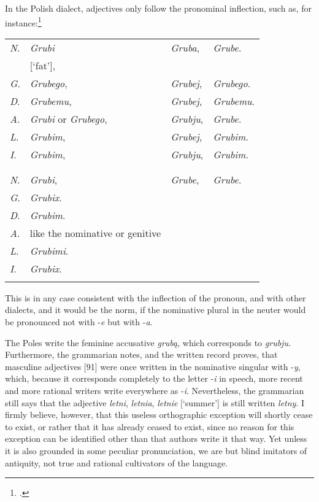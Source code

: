 In the Polish dialect, adjectives only follow the pronominal inflection, such as, for instance:\footnote{\citet[24]{adamowicz_praktische_1796-1}.}

\begin{longtable}{ l l l l }    
    \lsptoprule
    \multicolumn{4}{ c }{Singular.} \\
    \midrule
    \textit{N}. & \textit{Grubi} & \textit{Gruba}, & \textit{Grube}. \\
    & [‘fat’], & & \\
    \textit{G}. & \textit{Grubego}, & \textit{Grubej}, & \textit{Grubego}. \\
    \textit{D}. & \textit{Grubemu}, & \textit{Grubej}, & \textit{Grubemu}. \\
    \textit{A}. & \textit{Grubi} or \textit{Grubego}, & \textit{Grubju}, & \textit{Grube}. \\
    \textit{L}. & \textit{Grubim}, & \textit{Grubej}, & \textit{Grubim}. \\
    \textit{I}. & \textit{Grubim}, & \textit{Grubju}, & \textit{Grubim}. \\
    \lspbottomrule
    \\
    \lsptoprule
    \multicolumn{4}{ c }{Plural.} \\
    \midrule
    \textit{N}. & \textit{Grubi}, & \textit{Grube}, & \textit{Grube}. \\
    \textit{G}. & \textit{Grubix}. & & \\
    \textit{D}. & \textit{Grubim}. & & \\
    \textit{A}. & like the nominative or genitive & & \\
    \textit{L}. & \textit{Grubimi}. & &  \\
    \textit{I}. & \textit{Grubix}. & & \\
    \lspbottomrule
\end{longtable}

This is in any case consistent with the inflection of the pronoun, and with other dialects, and it would be the norm, if the nominative plural in the neuter would be pronounced not with -\textit{e} but with -\textit{a}.

The Poles write the feminine accusative \textit{grubą}, which corresponds to \textit{grubju}. Furthermore, the grammarian notes, and the written record proves, that masculine adjectives [91] were once written in the nominative singular with -\textit{y}, which, because it corresponds completely to the letter -\textit{i} in speech, more recent and more rational writers write everywhere as -\textit{i}. Nevertheless, the grammarian still says that the adjective \textit{letni}, \textit{letnia}, \textit{letnie} [‘summer’] is still written \textit{letny}. I firmly believe, however, that this useless orthographic exception will shortly cease to exist, or rather that it has already ceased to exist, since no reason for this exception can be identified other than that authors write it that way. Yet unless it is also grounded in some peculiar pronunciation, we are but blind imitators of antiquity, not true and rational cultivators of the language.

